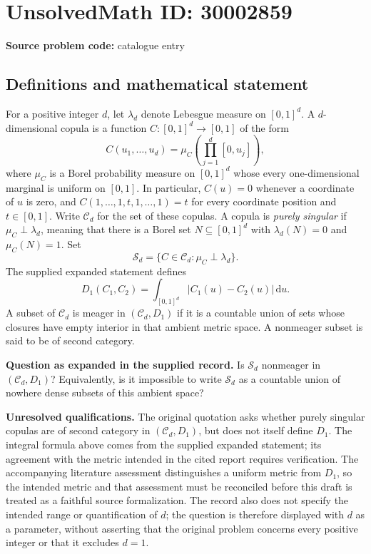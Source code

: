 \documentclass[11pt]{article}
\begin{document}
\section*{UnsolvedMath ID: 30002859}
\textbf{Source problem code:} catalogue entry
\subsection{Definitions and mathematical statement}
For a positive integer \(d\), let \(\lambda_d\) denote Lebesgue measure on \([0,1]^d\). A \(d\)-dimensional copula is a function \(C:[0,1]^d\to[0,1]\) of the form
\[
C(u_1,\ldots,u_d)=\mu_C\!\left(\prod_{j=1}^d[0,u_j]\right),
\]
where \(\mu_C\) is a Borel probability measure on \([0,1]^d\) whose every one-dimensional marginal is uniform on \([0,1]\). In particular, \(C(u)=0\) whenever a coordinate of \(u\) is zero, and \(C(1,\ldots,1,t,1,\ldots,1)=t\) for every coordinate position and \(t\in[0,1]\). Write \(\mathcal C_d\) for the set of these copulas. A copula is \emph{purely singular} if \(\mu_C\perp\lambda_d\), meaning that there is a Borel set \(N\subseteq[0,1]^d\) with \(\lambda_d(N)=0\) and \(\mu_C(N)=1\). Set
\[
\mathcal S_d=\{C\in\mathcal C_d:\mu_C\perp\lambda_d\}.
\]
The supplied expanded statement defines
\[
D_1(C_1,C_2)=\int_{[0,1]^d}|C_1(u)-C_2(u)|\,\mathrm du.
\]
A subset of \(\mathcal C_d\) is meager in \((\mathcal C_d,D_1)\) if it is a countable union of sets whose closures have empty interior in that ambient metric space. A nonmeager subset is said to be of second category.

\textbf{Question as expanded in the supplied record.} Is \(\mathcal S_d\) nonmeager in \((\mathcal C_d,D_1)\)? Equivalently, is it impossible to write \(\mathcal S_d\) as a countable union of nowhere dense subsets of this ambient space?

\textbf{Unresolved qualifications.} The original quotation asks whether purely singular copulas are of second category in \((\mathcal C_d,D_1)\), but does not itself define \(D_1\). The integral formula above comes from the supplied expanded statement; its agreement with the metric intended in the cited report requires verification. The accompanying literature assessment distinguishes a uniform metric from \(D_1\), so the intended metric and that assessment must be reconciled before this draft is treated as a faithful source formalization. The record also does not specify the intended range or quantification of \(d\); the question is therefore displayed with \(d\) as a parameter, without asserting that the original problem concerns every positive integer or that it excludes \(d=1\).
\end{document}
